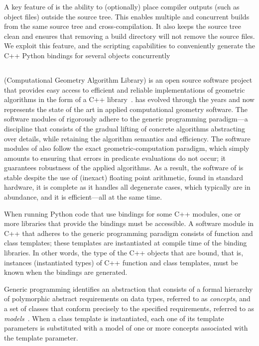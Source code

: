 A key feature of \cmake{} is the ability to (optionally) place
compiler outputs (such as object files) outside the source tree. This
enables multiple and concurrent builds from the same source tree and
cross-compilation. It also keeps the source tree clean and ensures
that removing a build directory will not remove the source files.  We
exploit this feature, and the scripting capabilities to conveniently
generate the C++ Python bindings for several \cgal{} objects
concurrently

\subsection{\cgal}
\label{ssec:intro:cgal}
\cgal{} (Computational Geometry Algorithm Library) is an open source
software project that provides easy access to efficient and reliable
implementations of geometric algorithms in the form of a C++
library~\cite{cgal:eb-21}. \cgal{} has evolved through the years and
now represents the state of the art in applied computational geometry
software. The software modules of \cgal{} rigorously adhere to the
generic programming paradigm---a discipline that consists of the
gradual lifting of concrete algorithms abstracting over details, while
retaining the algorithm semantics and efficiency. The software modules
of \cgal{} also follow the exact geometric-computation paradigm, which
simply amounts to ensuring that errors in predicate evaluations do not
occur; it guarantees robustness of the applied algorithms.  As a
result, the software of \cgal{} is stable despite the use of (inexact)
floating point arithmetic, found in standard hardware, it is complete
as it handles all degenerate cases, which typically are in abundance,
and it is efficient---all at the same time.

When running Python code that use bindings for some C++ modules, one
or more libraries that provide the bindings must be accessible.  A
software module in C++ that adheres to the generic programming
paradigm consists of function and class templates; these templates are
instantiated at compile time of the binding libraries. In other words,
the type of the C++ objects that are bound, that is, instances
(instantiated types) of C++ function and class templates, must be
known when the bindings are generated.

Generic programming identifies an abstraction that consists of a
formal hierarchy of polymorphic abstract requirements on data types,
referred to as \emph{concepts}, and a set of classes that conform
precisely to the specified requirements, referred to as
\emph{models}~\cite{a-gps-99}. When a class template is instantiated,
each one of its template parameters is substituted with a model of one
or more concepts associated with the template parameter.

